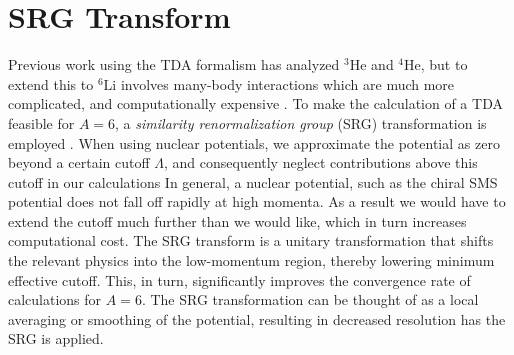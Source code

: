 \documentclass[a4paper,11pt]{article}
\newcommand{\LiS}{{}^{6} \mathrm{Li} }
\newcommand{\HeF}{{}^{4} \mathrm{He}}
\newcommand{\HeT}{{}^{3} \mathrm{He}}
\begin{document}
\section{SRG Transform}
Previous work using the TDA formalism has analyzed
$\HeT$ and $\HeF$, but to extend this to $\LiS$ involves many-body
interactions which are much more complicated, and computationally expensive
\cite{hammer2020, hammer4He}.
To make the calculation of a TDA feasible for $A=6$, a \textit{similarity renormalization group} (SRG) transformation
is employed \cite{SRG}.
When using nuclear potentials, we approximate the potential as zero beyond a certain cutoff $\Lambda$, and consequently
neglect contributions above this cutoff in our calculations
In general, a nuclear potential, such as the chiral SMS potential does
not fall off rapidly at high momenta. As a result we would have to
extend the cutoff much further than we would like, which in turn
increases computational cost.
The SRG transform is a unitary transformation that
shifts the relevant physics into the low-momentum
region, thereby lowering minimum effective cutoff. This, in turn,
significantly improves the convergence rate of calculations for $A=6$.
The SRG transformation can be thought of as a local averaging or
smoothing of the potential, resulting in decreased resolution
has the SRG is applied.
\end{document}
